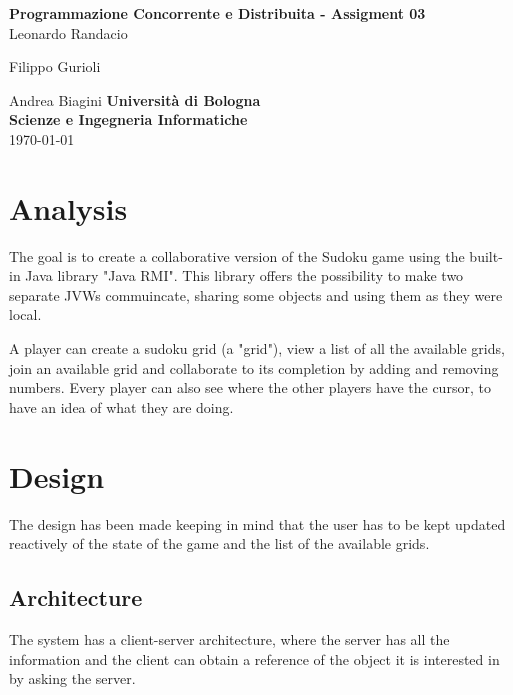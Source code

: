 \documentclass[12pt, a4paper]{report}
\begin{document}
\renewcommand\bibname{References} %


\begin{titlepage}

\begin{center}

\Large \textbf {Programmazione Concorrente e Distribuita - Assigment 03}\\%
\vspace{1em}%
\vfill
Leonardo Randacio


Filippo Gurioli


Andrea Biagini
\vspace{1em}
\vfill
{\bf Università di Bologna \\ Scienze e Ingegneria Informatiche}\\[0.5in]

       
\vfill
\today

\end{center}

\end{titlepage}


\tableofcontents
\listoffigures
\listoftables

\newpage
{} %

\chapter{Analysis}
The goal is to create a collaborative version of the Sudoku game using the 
 built-in Java library "Java RMI". This library offers the possibility to
 make two separate JVWs commuincate, sharing some objects and using them as
 they were local.

A player can create a sudoku grid (a "grid"), view a list of all the
 available grids, join an available grid and collaborate to its completion
 by adding and removing numbers. Every player can also see where the other
 players have the cursor, to have an idea of what they are doing.

\chapter{Design}
The design has been made keeping in mind that the user has to be kept updated
 reactively of the state of the game and the list of the available grids.

\section{Architecture}
The system has a client-server architecture, where the server has all the
 information and the client can obtain a reference of the object it is
 interested in by asking the server.
\end{document}
